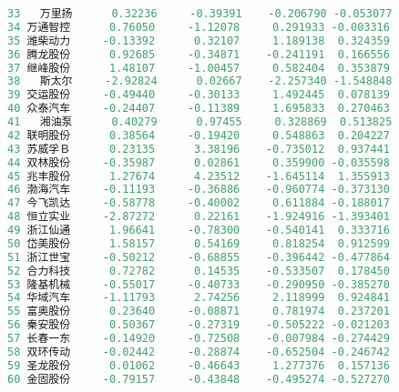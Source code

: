 \documentclass[11pt,a4paper,oneside]{book}
\begin{document}
\begin{lstlisting}[language=r]
33   万里扬      0.32236     -0.39391    -0.206790 -0.053077
34 万通智控      0.76050     -1.12078     0.291933 -0.003316
35 潍柴动力     -0.13392      0.32107     1.189138  0.324359
36 腾龙股份      0.92685     -0.34871    -0.241191  0.166556
37 继峰股份      1.48107     -1.00457     0.582404  0.353879
38   斯太尔     -2.92824      0.02667    -2.257340 -1.548848
39 交运股份     -0.49440     -0.30133     1.492445  0.078139
40 众泰汽车     -0.24407     -0.11389     1.695833  0.270463
41   湘油泵      0.40279      0.97455     0.328869  0.513825
42 联明股份      0.38564     -0.19420     0.548863  0.204227
43 苏威孚Ｂ      0.23135      3.38196    -0.735012  0.937441
44 双林股份     -0.35987      0.02861     0.359900 -0.035598
45 兆丰股份      1.27674      4.23512    -1.645114  1.355913
46 渤海汽车     -0.11193     -0.36886    -0.960774 -0.373130
47 今飞凯达     -0.58778     -0.40002     0.611884 -0.188017
48 恒立实业     -2.87272      0.22161    -1.924916 -1.393401
49 浙江仙通      1.96641     -0.78300    -0.540141  0.333716
50 岱美股份      1.58157      0.54169     0.818254  0.912599
51 浙江世宝     -0.50212     -0.68855    -0.396442 -0.477864
52 合力科技      0.72782      0.14535    -0.533507  0.178450
53 隆基机械     -0.55017     -0.40733    -0.290950 -0.385270
54 华域汽车     -1.11793      2.74256     2.118999  0.924841
55 富奥股份      0.23640     -0.08871     0.781974  0.237201
56 秦安股份      0.50367     -0.27319    -0.505222 -0.021203
57 长春一东     -0.14920     -0.72508    -0.007984 -0.274429
58 双环传动     -0.02442     -0.28874    -0.652504 -0.246742
59 圣龙股份      0.01062     -0.46643     1.277376  0.157136
60 金固股份     -0.79157     -0.43848    -0.495274 -0.527270
\end{lstlisting}
\end{document}
